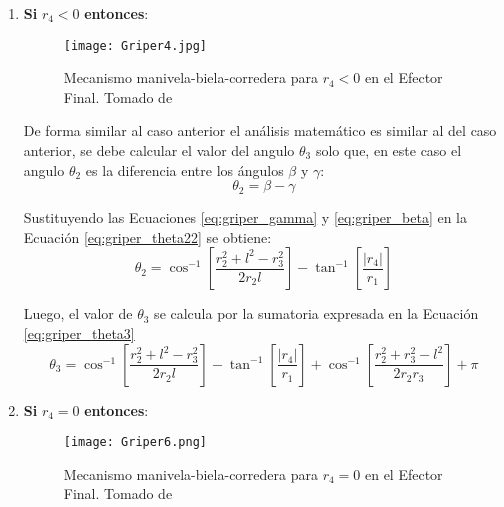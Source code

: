 \begin{enumerate}
\item \textbf{Si} $r_4<0$ \textbf{entonces}:
\begin{figure}[htb]
    \centering
     \texttt{[image: Griper4.jpg]}
    \caption [Mecanismo manivela-biela-corredera para $r_4<0$ en el Efector Final.]{Mecanismo manivela-biela-corredera para $r_4<0$ en el Efector Final. Tomado de \cite{zapata_zapata_control_2017} }
    \label{fig:Griper_MBC2}
\end{figure}

De forma similar al caso anterior el análisis matemático es similar al del caso anterior, se debe calcular el valor del angulo $\theta_3$ solo que, en este caso el angulo $\theta_2$ es la diferencia entre los ángulos $\beta$ y $\gamma$:
\begin{equation}\label{eq:griper_theta22}
\theta_2=\beta-\gamma
\end{equation}

Sustituyendo las Ecuaciones \ref{eq:griper_gamma} y \ref{eq:griper_beta} en la Ecuación \ref{eq:griper_theta22} se obtiene:
\begin{equation}\label{eq:griper_theta221}
\theta_2=  \cos^{-1}\left[  \frac{r^2_2 +l^2-r^2_3}{2r_2l}\right]- \tan^{-1}\left[  \frac{|r_4|}{r_1}\right]
\end{equation}

Luego, el valor de $\theta_3$ se calcula por la sumatoria expresada en la Ecuación \ref{eq:griper_theta3}
\begin{equation}\label{eq:griper_theta3}
\theta_3= \cos^{-1}\left[  \frac{r^2_2 +l^2-r^2_3}{2r_2l}\right]- \tan^{-1}\left[  \frac{|r_4|}{r_1}\right]+\cos^{-1}\left[ \frac{r^2_2 +r^2_3-l^2}{2r_2r_3}\right]+\pi
\end{equation}

\item \textbf{Si} $r_4=0$ \textbf{entonces}:
\begin{figure}[htb]
    \centering
     \texttt{[image: Griper6.png]}
    \caption[Mecanismo manivela-biela-corredera para $r_4 =0$ en el Efector Final.]{Mecanismo manivela-biela-corredera para $r_4 =0$ en el Efector Final. Tomado de \cite{zapata_zapata_control_2017} }
    \label{fig:Griper_MBC3}
\end{figure}


\end{enumerate}
